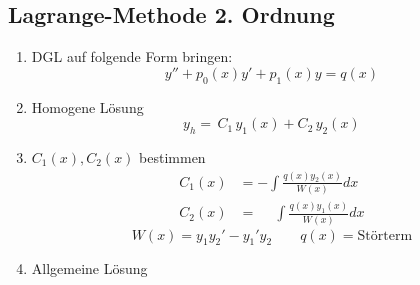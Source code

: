 \subsection{Lagrange-Methode 2. Ordnung}\label{sec:Lagrange-2-Ordnung}
    \begin{enumerate}
        \item DGL auf folgende Form bringen:
            $$
                y'' + p_0(x) y' + p_1(x)y = q(x)
            $$
        \item Homogene Lösung
            $$
                y_h =\, C_1\,y_1(x) + C_2\,y_2(x)
            $$
        \item $C_1(x), C_2(x)$ bestimmen
            \begin{align*}
                C_1(x) &= - \int \frac{q(x) y_2(x)}{W(x)} dx\\[0.25em]
                C_2(x) &= \phantom{-}\int \frac{q(x) y_1(x)}{W(x)} dx
            \end{align*}
            \vspace{0.5em}
            $$
                W(x) = y_1y_2' - y_1'y_2 \qquad q(x) = \textrm{Störterm}
            $$
        \item Allgemeine Lösung
        
    \end{enumerate}